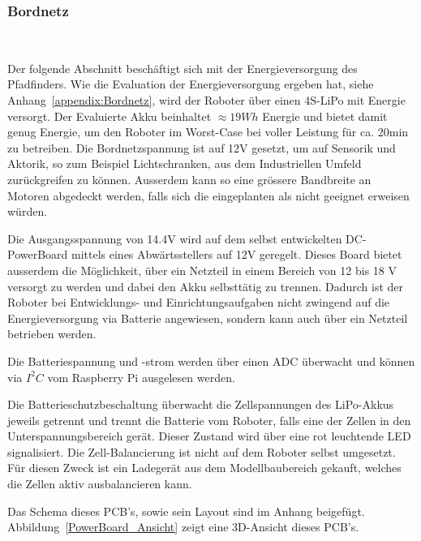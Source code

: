 \documentclass[main.tex]{subfiles} %
\begin{document}

\subsubsection{Bordnetz}~\label{sec:Bordnetz}

Der folgende Abschnitt beschäftigt sich mit der Energieversorgung des
Pfadfinders. Wie die Evaluation der Energieversorgung ergeben hat, siehe
Anhang~\ref{appendix:Bordnetz}, wird der Roboter über einen 4S-LiPo mit Energie
versorgt. Der Evaluierte Akku beinhaltet $\approx 19Wh$ Energie und bietet
damit genug Energie, um den Roboter im Worst-Case bei voller Leistung für ca.
20min zu betreiben. Die Bordnetzspannung ist auf 12V gesetzt, um auf Sensorik
und Aktorik, so zum Beispiel Lichtschranken, aus dem Industriellen Umfeld
zurückgreifen zu können. Ausserdem kann so eine grössere Bandbreite an Motoren
abgedeckt werden, falls sich die eingeplanten als nicht geeignet erweisen
würden.

Die Ausgangsspannung von 14.4V wird auf dem selbst entwickelten DC-PowerBoard
mittels eines Abwärtsstellers auf 12V geregelt. Dieses Board bietet ausserdem
die Möglichkeit, über ein Netzteil in einem Bereich von 12 bis 18 V versorgt zu
werden und dabei den Akku selbsttätig zu trennen. Dadurch ist der Roboter bei
Entwicklungs- und Einrichtungsaufgaben nicht zwingend auf die Energieversorgung
via Batterie angewiesen, sondern kann auch über ein Netzteil betrieben werden.

Die Batteriespannung und -strom werden über einen ADC überwacht und können via
$I^2C$ vom Raspberry Pi ausgelesen werden.

Die Batterieschutzbeschaltung überwacht die Zellspannungen des LiPo-Akkus
jeweils getrennt und trennt die Batterie vom Roboter, falls eine der Zellen in
den Unterspannungsbereich gerät. Dieser Zustand wird über eine rot leuchtende
LED signalisiert. Die Zell-Balancierung ist nicht auf dem Roboter selbst
umgesetzt. Für diesen Zweck ist ein Ladegerät aus dem Modellbaubereich gekauft,
welches die Zellen aktiv ausbalancieren kann.

Das Schema dieses PCB's, sowie sein Layout sind im Anhang beigefügt.
Abbildung~\ref{PowerBoard_Ansicht} zeigt eine 3D-Ansicht dieses PCB's.
\end{document}
